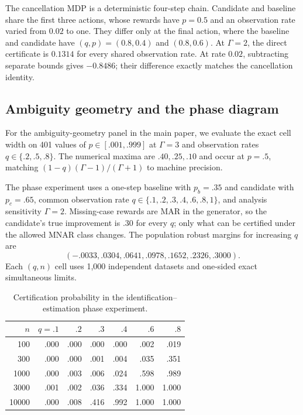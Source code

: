 \documentclass[letterpaper]{article}
\begin{document}
The cancellation MDP is a deterministic four-step chain. Candidate and baseline share the first three actions, whose rewards have $p=0.5$ and an observation rate varied from $0.02$ to one. They differ only at the final action, where the baseline and candidate have $(q,p)=(0.8,0.4)$ and $(0.8,0.6)$. At $\Gamma=2$, the direct certificate is $0.1314$ for every shared observation rate. At rate $0.02$, subtracting separate bounds gives $-0.8486$; their difference exactly matches the cancellation identity.


\subsection{Ambiguity geometry and the phase diagram}
For the ambiguity-geometry panel in the main paper, we evaluate the exact cell width on 401 values of $p\in[.001,.999]$ at $\Gamma=3$ and observation rates $q\in\{.2,.5,.8\}$. The numerical maxima are $.40,.25,.10$ and occur at $p=.5$, matching $(1-q)(\Gamma-1)/(\Gamma+1)$ to machine precision.

The phase experiment uses a one-step baseline with $p_b=.35$ and candidate with $p_c=.65$, common observation rate
$q\in\{.1,.2,.3,.4,.6,.8,1\}$, and analysis sensitivity $\Gamma=2$. Missing-case rewards are MAR in the generator, so the candidate's true improvement is $.30$ for every $q$; only what can be certified under the allowed MNAR class changes. The population robust margins for increasing $q$ are
\[
(-.0033,.0304,.0641,.0978,.1652,.2326,.3000).
\]
Each $(q,n)$ cell uses 1,000 independent datasets and one-sided exact simultaneous limits.

\begin{table}[t]
\centering
\small
\caption{Certification probability in the identification--estimation phase experiment.}
\label{tab:phase-supp}
\begin{tabular}{rrrrrrr}
\toprule
$n$ & $q=.1$ & $.2$ & $.3$ & $.4$ & $.6$ & $.8$ \\
\midrule
100   & .000 & .000 & .000 & .000 & .002 & .019 \\
300   & .000 & .000 & .001 & .004 & .035 & .351 \\
1000  & .000 & .003 & .006 & .024 & .598 & .989 \\
3000  & .001 & .002 & .036 & .334 & 1.000 & 1.000 \\
10000 & .000 & .008 & .416 & .992 & 1.000 & 1.000 \\
\bottomrule
\end{tabular}
\end{table}
\end{document}
